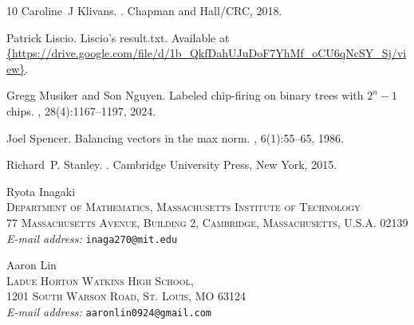 \documentclass[11pt]{article}
\theoremstyle{remark}
\theoremstyle{definition}
\begin{document}
\begin{thebibliography}{10}
Caroline~J Klivans.
.
\newblock Chapman and Hall/CRC, 2018.

Patrick Liscio.
\newblock Liscio’s result.txt.
\newblock Available at \url{{https://drive.google.com/file/d/1b_QkfDahUJuDoF7YhMf_oCU6qNcSY_Sj/view}}.

Gregg Musiker and Son Nguyen.
\newblock Labeled chip-firing on binary trees with {$2^n-1$} chips.
, 28(4):1167--1197, 2024.

Joel Spencer.
\newblock Balancing vectors in the max norm.
, 6(1):55--65, 1986.

Richard~P. Stanley.
.
\newblock Cambridge University Press, New York, 2015.

\end{thebibliography}


\smallskip

\noindent
Ryota Inagaki \\
\textsc{
Department of Mathematics, Massachusetts Institute of Technology\\
77 Massachusetts Avenue, Building 2, Cambridge, Massachusetts, U.S.A. 02139}\\
\textit{E-mail address: }\texttt{inaga270@mit.edu}
\medskip

\noindent
Aaron Lin \\
\textsc{
Ladue Horton Watkins High School,\\
1201 South Warson Road, St. Louis, MO 63124}\\
\textit{E-mail address: }\texttt{aaronlin0924@gmail.com}
\medskip
\end{document}
